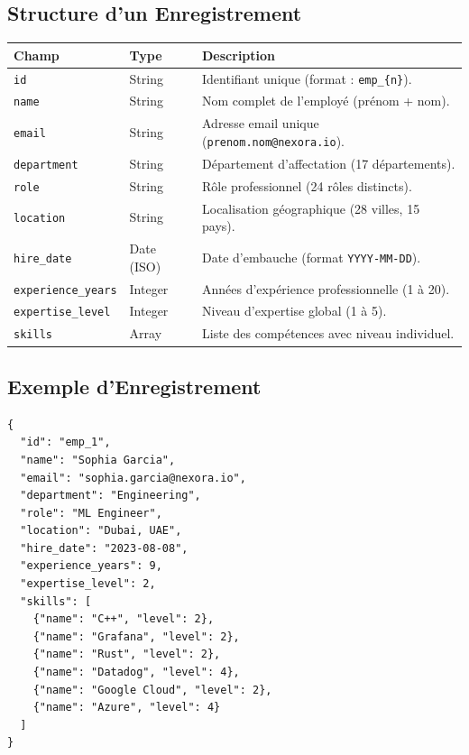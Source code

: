 \documentclass[12pt,a4paper]{article}
\begin{document}
\subsection{Structure d'un Enregistrement}

\begin{longtable}{|p{3.5cm}|p{2.5cm}|p{7.5cm}|}
\hline
\rowcolor{bleu!15}
\textbf{Champ} & \textbf{Type} & \textbf{Description} \\
\hline
\texttt{id} & String & Identifiant unique (format : \texttt{emp\_\{n\}}). \\
\hline
\texttt{name} & String & Nom complet de l'employé (prénom + nom). \\
\hline
\texttt{email} & String & Adresse email unique (\texttt{prenom.nom@nexora.io}). \\
\hline
\texttt{department} & String & Département d'affectation (17 départements). \\
\hline
\texttt{role} & String & Rôle professionnel (24 rôles distincts). \\
\hline
\texttt{location} & String & Localisation géographique (28 villes, 15 pays). \\
\hline
\texttt{hire\_date} & Date (ISO) & Date d'embauche (format \texttt{YYYY-MM-DD}). \\
\hline
\texttt{experience\_years} & Integer & Années d'expérience professionnelle (1 à 20). \\
\hline
\texttt{expertise\_level} & Integer & Niveau d'expertise global (1 à 5). \\
\hline
\texttt{skills} & Array & Liste des compétences avec niveau individuel. \\
\hline
\end{longtable}

\subsection{Exemple d'Enregistrement}

\begin{lstlisting}[language={}]
{
  "id": "emp_1",
  "name": "Sophia Garcia",
  "email": "sophia.garcia@nexora.io",
  "department": "Engineering",
  "role": "ML Engineer",
  "location": "Dubai, UAE",
  "hire_date": "2023-08-08",
  "experience_years": 9,
  "expertise_level": 2,
  "skills": [
    {"name": "C++", "level": 2},
    {"name": "Grafana", "level": 2},
    {"name": "Rust", "level": 2},
    {"name": "Datadog", "level": 4},
    {"name": "Google Cloud", "level": 2},
    {"name": "Azure", "level": 4}
  ]
}
\end{lstlisting}
\end{document}
